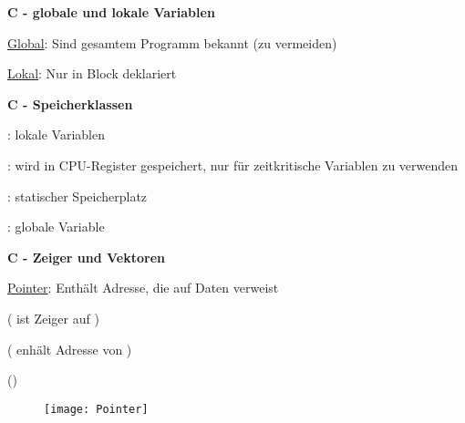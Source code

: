 \textbf{C - globale und lokale Variablen}
\begin{items}
  \item \underline{Global}: Sind gesamtem Programm bekannt (zu vermeiden)
  \item \underline{Lokal}: Nur in Block deklariert
\end{items}

\textbf{C - Speicherklassen}
\begin{items}
  \item \underline{}: lokale Variablen
  \item \underline{}: wird in CPU-Register gespeichert, nur für zeitkritische Variablen zu verwenden
  \item \underline{}: statischer Speicherplatz
  \item \underline{}: globale Variable
\end{items}

\textbf{C - Zeiger und Vektoren}
\begin{items}
  \item \underline{Pointer}: Enthält Adresse, die auf Daten verweist
  \item {} ( ist Zeiger auf )
  \item {} ( enhält Adresse von )
  \item {} ()
\end{items}
\begin{figure}[ht]
  \centering
  \texttt{[image: Pointer]}
  \label{Pointer}
\end{figure}